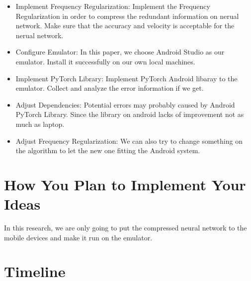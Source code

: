 \documentclass{article}
\newcommand{\chronoperiode}[7]{
	\pgfmathsetmacro{\first}{(#2 - 2023)*12 + #3 - .9} %
	\pgfmathsetmacro{\last}{(#4 - 2023)*12 + #5 - 1.1} %
	\pgfmathsetmacro{\middle}{(\first+\last)/2} %
	
	\fill[#7] (\first,#6-1) rectangle (\last,#6) (\middle,#6-.5) node[white, font=\sf]{#1};
}
\begin{document}
\begin{itemize}
	\item Implement Frequency Regularization: Implement the Frequency Regularization in order to compress the redundant information on nerual network. Make sure that the accuracy and velocity is acceptable for the nerual network.
	
	\item Configure Emulator: In this paper, we choose Android Studio as our emulator. Install it successfully on our own local machines.
	
	\item Implement PyTorch Library: Implement PyTorch Android libaray to the emulator. Collect and analyze the error information if we get.
	
	\item Adjust Dependencies: Potential errors may probably caused by Android PyTorch Library. Since the library on android lacks of improvement not as much as laptop.
	
	\item Adjust Frequency Regularization: We can also try to change something on the algorithm to let the new one fitting the Android system.
	
\end{itemize}

\section*{How You Plan to Implement Your Ideas}

In this research, we are only going to put the compressed neural network to the mobile devices and make it run on the emulator. 



\section*{Timeline}

\end{document}
